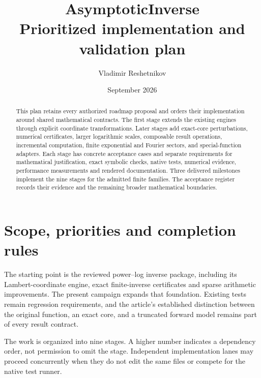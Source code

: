 \documentclass[11pt,a4paper]{article}
\title{AsymptoticInverse\\[0.4em]\large Prioritized implementation and validation plan}
\author{Vladimir Reshetnikov}
\date{September 2026}
\begin{document}
\setcounter{tocdepth}{1}
\maketitle

\begin{abstract}
This plan retains every authorized roadmap proposal and orders their implementation around shared mathematical contracts. The first stage extends the existing engines through explicit coordinate transformations. Later stages add exact-core perturbations, numerical certificates, larger logarithmic scales, composable result operations, incremental computation, finite exponential and Fourier sectors, and special-function adapters. Each stage has concrete acceptance cases and separate requirements for mathematical justification, exact symbolic checks, native tests, numerical evidence, performance measurements and rendered documentation. Three delivered milestones implement the nine stages for the admitted finite families. The acceptance register records their evidence and the remaining broader mathematical boundaries.
\end{abstract}

\tableofcontents

\section{Scope, priorities and completion rules}

The starting point is the reviewed power--log inverse package, including its Lambert-coordinate engine, exact finite-inverse certificates and sparse arithmetic improvements. The present campaign expands that foundation. Existing tests remain regression requirements, and the article's established distinction between the original function, an exact core, and a truncated forward model remains part of every result contract.

The work is organized into nine stages. A higher number indicates a dependency order, not permission to omit the stage. Independent implementation lanes may proceed concurrently when they do not edit the same files or compete for the native test runner.
\end{document}
